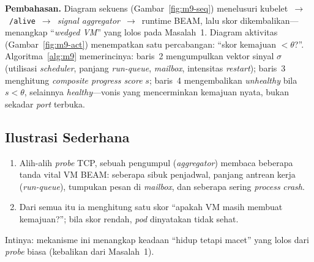 \noindent\textbf{Pembahasan.} Diagram sekuens (Gambar~\ref{fig:m9-seq}) menelusuri
kubelet~$\rightarrow$~\texttt{/alive}~$\rightarrow$~\emph{signal aggregator}~$\rightarrow$~runtime
BEAM, lalu skor dikembalikan---menangkap ``\emph{wedged VM}'' yang lolos pada Masalah~1.
Diagram aktivitas (Gambar~\ref{fig:m9-act}) menempatkan satu percabangan: ``skor kemajuan
$< \theta$?''. Algoritma~\ref{alg:m9} memerincinya: baris~2 mengumpulkan vektor sinyal
$\sigma$ (utilisasi \emph{scheduler}, panjang \emph{run-queue}, \emph{mailbox}, intensitas
\emph{restart}); baris~3 menghitung \emph{composite progress score} $s$; baris~4
mengembalikan \textit{unhealthy} bila $s<\theta$, selainnya \textit{healthy}---vonis yang
mencerminkan kemajuan nyata, bukan sekadar \emph{port} terbuka.

\subsection{Ilustrasi Sederhana}
\label{subsec:m9-ilustrasi}
\begin{enumerate}[nosep,leftmargin=2em]
  \item Alih-alih \emph{probe} TCP, sebuah pengumpul (\emph{aggregator}) membaca beberapa
        tanda vital VM BEAM: seberapa sibuk penjadwal, panjang antrean kerja
        (\emph{run-queue}), tumpukan pesan di \emph{mailbox}, dan seberapa sering
        \emph{process} \emph{crash}.
  \item Dari semua itu ia menghitung satu skor ``apakah VM masih membuat kemajuan?''; bila
        skor rendah, \emph{pod} dinyatakan tidak sehat.
\end{enumerate}
\noindent Intinya: mekanisme ini menangkap keadaan ``hidup tetapi macet'' yang lolos dari
\emph{probe} biasa (kebalikan dari Masalah~1).
